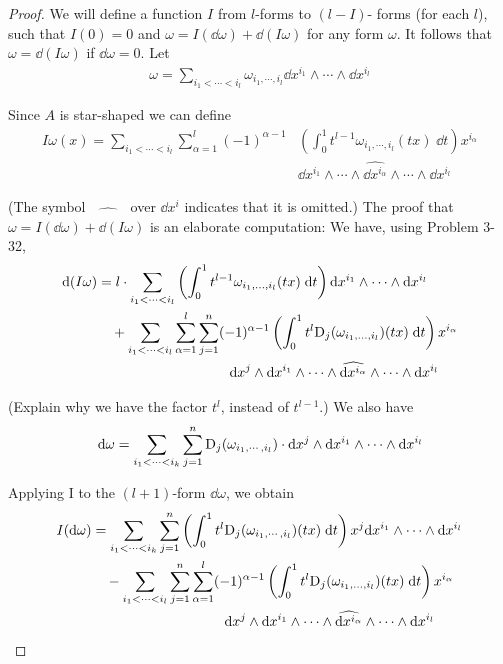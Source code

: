 \begin{proof}
    We will define a function $I$ from $l$-forms to $(l-I)$-
forms (for each $l$), such that $I(0) = 0$ and $\omega = I(\dd\omega) + \dd(I\omega)$
for any form $\omega$. It follows that $\omega = \dd(I\omega)$ if $\dd\omega = 0$. Let
\begin{align*}
    \omega = \sum_{i_1<\cdots<i_l}^{}{\omega_{i_1,\cdots,i_l}\dd x^{i_1}\wedge\cdots\wedge\dd x^{i_l}}
\end{align*}

Since $A$ is star-shaped we can define 
\begin{align*}
    I\omega(x) = \sum_{i_1<\cdots<i_l}^{}
        \sum_{\alpha=1}^{l}(-1)^{\alpha-1} & \left(\int_0^1t^{l-1}\omega_{i_1,\cdots,i_l}(tx)\;\dd t\right)x^{i_\alpha}\\
        & \dd x^{i_1}\wedge\cdots\wedge\widehat{\dd x^{i_\alpha}}\wedge\cdots\wedge\dd x^{i_l}
\end{align*}

(The symbol $\;\widehat{\qquad}\;$ over $\dd x^i$ indicates that it is omitted.) 
The proof that $\omega = I(\dd \omega) + \dd(I\omega)$
is an elaborate computation: We have, using Problem 3-32,
\begin{align*}
    \mathrm{d} (I\omega)
    & = l\cdot\sum_{i_1<\cdots<i_l}\left(\int_0^1t^{l-1}\omega_{i_1,\ldots,i_l}(tx)\;\mathrm{d} t\right)\mathrm{d} x^{i_1}\wedge\cdots\wedge\mathrm{d} x^{i_l} \\
    & \hspace*{1em} + \sum_{i_1<\cdots<i_l}\sum_{{\alpha}=1}^l\sum_{j=1}^n (-1)^{{\alpha}-1}\left(\int_0^1t^l\mathrm{D}_j(\omega_{i_1,\ldots,i_l})(tx)\;\mathrm{d} t\right)x^{i_\alpha} \\
    & \hspace*{9.5em} \mathrm{d} x^j\wedge \mathrm{d} x^{i_1}\wedge\cdots\wedge\widehat{\mathrm{d} x^{i_{\alpha}}}\wedge\cdots\wedge \mathrm{d} x^{i_{l}}
\end{align*}

(Explain why we have the factor $t^l$, instead of $t^{l-1}$.) We also have
\begin{align*}
    \mathrm{d}\omega
    = \sum_{i_1<\cdots<i_k}^{}{\sum_{j=1}^{n}{\mathrm{D}_j(\omega_{i_1,\cdots,i_l})\cdot \mathrm{d} x^j\wedge\mathrm{d} x^{i_1}\wedge\cdots\wedge\mathrm{d} x^{i_l}}}
\end{align*}

Applying I to the $(l+1)$-form $\dd \omega$, we obtain
\begin{align*}
    I(\mathrm{d} \omega)
    & = \sum_{i_1<\cdots<i_k}^{}\sum_{j=1}^{n}\left(\int_0^1t^l\mathrm{D}_j(\omega_{i_1,\cdots,i_l})(tx)\;\mathrm{d} t\right) x^j \mathrm{d} x^{i_1}\wedge\cdots\wedge\mathrm{d} x^{i_l} \\
    & \hspace*{1em} - \sum_{i_1<\cdots<i_l}\sum_{{j}=1}^n\sum_{\alpha=1}^l (-1)^{{\alpha}-1}\left(\int_0^1t^l\mathrm{D}_j(\omega_{i_1,\ldots,i_l})(tx)\;\mathrm{d} t\right)x^{i_\alpha} \\
    & \hspace*{9.5em} \mathrm{d} x^j\wedge \mathrm{d} x^{i_1}\wedge\cdots\wedge\widehat{\mathrm{d} x^{i_{\alpha}}}\wedge\cdots\wedge \mathrm{d} x^{i_{l}}
\end{align*}


\end{proof}
